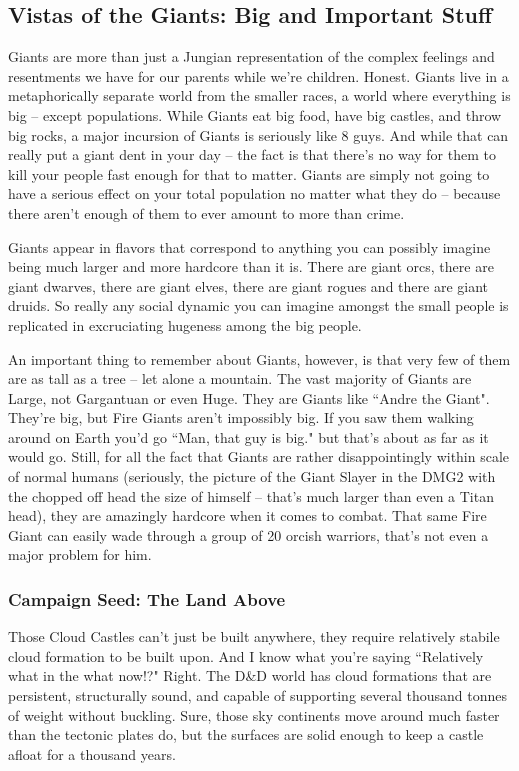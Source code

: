 \subsection{Vistas of the Giants: Big and Important Stuff}

Giants are more than just a Jungian representation of the complex feelings and resentments we have for our parents while we're children. Honest. Giants live in a metaphorically separate world from the smaller races, a world where everything is big -- except populations. While Giants eat big food, have big castles, and throw big rocks, a major incursion of Giants is seriously like 8 guys. And while that can really put a giant dent in your day -- the fact is that there's no way for them to kill your people fast enough for that to matter. Giants are simply not going to have a serious effect on your total population no matter what they do -- because there aren't enough of them to ever amount to more than crime.

Giants appear in flavors that correspond to anything you can possibly imagine being much larger and more hardcore than it is. There are giant orcs, there are giant dwarves, there are giant elves, there are giant rogues and there are giant druids. So really any social dynamic you can imagine amongst the small people is replicated in excruciating hugeness among the big people.

An important thing to remember about Giants, however, is that very few of them are as tall as a tree -- let alone a mountain. The vast majority of Giants are Large, not Gargantuan or even Huge. They are Giants like ``Andre the Giant". They're big, but Fire Giants aren't impossibly big. If you saw them walking around on Earth you'd go ``Man, that guy is big." but that's about as far as it would go. Still, for all the fact that Giants are rather disappointingly within scale of normal humans (seriously, the picture of the Giant Slayer in the DMG2 with the chopped off head the size of himself -- that's much larger than even a Titan head), they are amazingly hardcore when it comes to combat. That same Fire Giant can easily wade through a group of 20 orcish warriors, that's not even a major problem for him.

\subsubsection{Campaign Seed: The Land Above}
Those Cloud Castles can't just be built anywhere, they require relatively stabile cloud formation to be built upon. And I know what you're saying ``Relatively what in the what now!?" Right. The D\&D world has cloud formations that are persistent, structurally sound, and capable of supporting several thousand tonnes of weight without buckling. Sure, those sky continents move around much faster than the tectonic plates do, but the surfaces are solid enough to keep a castle afloat for a thousand years.

